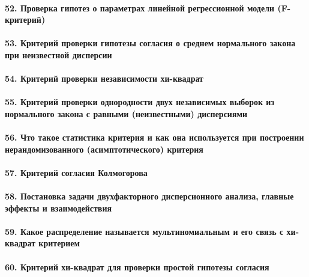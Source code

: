 \documentclass[titlepage]{article}
\begin{document}
\paragraph{52. Проверка гипотез о параметрах линейной регрессионной модели (F-критерий)}

\paragraph{53. Критерий проверки гипотезы согласия о среднем нормального закона при неизвестной дисперсии}

\paragraph{54. Критерий проверки независимости хи-квадрат}

\paragraph{55. Критерий проверки однородности двух независимых выборок из нормального закона с равными (неизвестными) дисперсиями}

\paragraph{56. Что такое статистика критерия и как она используется при построении нерандомизованного (асимптотического) критерия}

\paragraph{57. Критерий согласия Колмогорова}

\paragraph{58. Постановка задачи двухфакторного дисперсионного анализа, главные эффекты и взаимодействия}

\paragraph{59. Какое распределение называется мультиномиальным и его связь с хи-квадрат критерием}

\paragraph{60. Критерий хи-квадрат для проверки простой гипотезы согласия}
\end{document}
